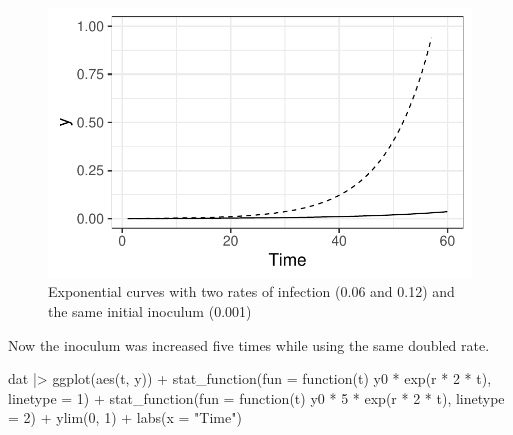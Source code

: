 \documentclass[
  letterpaper,
  DIV=11,
  numbers=noendperiod]{scrreprt}
\newenvironment{Shaded}{\begin{snugshade}}{\end{snugshade}}
\newcommand{\AttributeTok}[1]{\textcolor[rgb]{0.40,0.45,0.13}{#1}}
\newcommand{\ControlFlowTok}[1]{\textcolor[rgb]{0.00,0.23,0.31}{#1}}
\newcommand{\DecValTok}[1]{\textcolor[rgb]{0.68,0.00,0.00}{#1}}
\newcommand{\FunctionTok}[1]{\textcolor[rgb]{0.28,0.35,0.67}{#1}}
\newcommand{\NormalTok}[1]{\textcolor[rgb]{0.00,0.23,0.31}{#1}}
\newcommand{\SpecialCharTok}[1]{\textcolor[rgb]{0.37,0.37,0.37}{#1}}
\newcommand{\StringTok}[1]{\textcolor[rgb]{0.13,0.47,0.30}{#1}}
\begin{document}
\begin{figure}[H]

{\centering \includegraphics{temporal-models_files/figure-pdf/fig-exp1-1.pdf}

}

\caption{\label{fig-exp1}Exponential curves with two rates of infection
(0.06 and 0.12) and the same initial inoculum (0.001)}

\end{figure}

Now the inoculum was increased five times while using the same doubled
rate.

\begin{Shaded}
\begin{Highlighting}[]
\NormalTok{dat }\SpecialCharTok{|\textgreater{}}
  \FunctionTok{ggplot}\NormalTok{(}\FunctionTok{aes}\NormalTok{(t, y)) }\SpecialCharTok{+}
  \FunctionTok{stat\_function}\NormalTok{(}\AttributeTok{fun =} \ControlFlowTok{function}\NormalTok{(t) y0 }\SpecialCharTok{*} \FunctionTok{exp}\NormalTok{(r }\SpecialCharTok{*} \DecValTok{2} \SpecialCharTok{*}\NormalTok{ t), }\AttributeTok{linetype =} \DecValTok{1}\NormalTok{) }\SpecialCharTok{+}
  \FunctionTok{stat\_function}\NormalTok{(}\AttributeTok{fun =} \ControlFlowTok{function}\NormalTok{(t) y0 }\SpecialCharTok{*} \DecValTok{5} \SpecialCharTok{*} \FunctionTok{exp}\NormalTok{(r }\SpecialCharTok{*} \DecValTok{2} \SpecialCharTok{*}\NormalTok{ t), }\AttributeTok{linetype =} \DecValTok{2}\NormalTok{) }\SpecialCharTok{+}
  \FunctionTok{ylim}\NormalTok{(}\DecValTok{0}\NormalTok{, }\DecValTok{1}\NormalTok{) }\SpecialCharTok{+}
  \FunctionTok{labs}\NormalTok{(}\AttributeTok{x =} \StringTok{"Time"}\NormalTok{)}
\end{Highlighting}
\end{Shaded}
\end{document}
